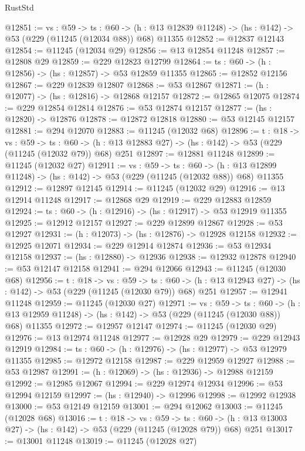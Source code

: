 \begin{lexlean}{RustStd}
\begin{coremodule}
@12851 := {vs : @59} ->
  {ts : @60} ->
  (h : @13 @12839 @11248) -> (hs : @142) -> @53 (@229 (@11245 (@12034 @88)) @68) @11355
@12852 := @12837 @12143
@12854 := @11245 (@12034 @29)
@12856 := @13 @12854 @11248
@12857 := @12808 @29
@12859 := @229 @12823 @12799
@12864 := {ts : @60} -> (h : @12856) -> (hs : @12857) -> @53 @12859 @11355
@12865 := @12852 @12156
@12867 := @229 @12839 @12807
@12868 := @53 @12867
@12871 := (h : @12077) -> (hs : @12816) -> @12868 @12157
@12872 := @12865 @12075
@12874 := @229 @12854 @12814
@12876 := @53 @12874 @12157
@12877 := (hs : @12820) -> @12876
@12878 := @12872 @12818
@12880 := @53 @12145 @12157
@12881 := @294 @12070
@12883 := @11245 (@12032 @68)
@12896 := {t : @18} ->
  {vs : @59} ->
  {ts : @60} -> (h : @13 @12883 @27) -> (hs : @142) -> @53 (@229 (@11245 (@12032 @79)) @68) @251
@12897 := @12881 @11248
@12899 := @11245 (@12032 @27)
@12911 := {vs : @59} ->
  {ts : @60} ->
  (h : @13 @12899 @11248) -> (hs : @142) -> @53 (@229 (@11245 (@12032 @88)) @68) @11355
@12912 := @12897 @12145
@12914 := @11245 (@12032 @29)
@12916 := @13 @12914 @11248
@12917 := @12868 @29
@12919 := @229 @12883 @12859
@12924 := {ts : @60} -> (h : @12916) -> (hs : @12917) -> @53 @12919 @11355
@12925 := @12912 @12157
@12927 := @229 @12899 @12867
@12928 := @53 @12927
@12931 := (h : @12073) -> (hs : @12876) -> @12928 @12158
@12932 := @12925 @12071
@12934 := @229 @12914 @12874
@12936 := @53 @12934 @12158
@12937 := (hs : @12880) -> @12936
@12938 := @12932 @12878
@12940 := @53 @12147 @12158
@12941 := @294 @12066
@12943 := @11245 (@12030 @68)
@12956 := {t : @18} ->
  {vs : @59} ->
  {ts : @60} -> (h : @13 @12943 @27) -> (hs : @142) -> @53 (@229 (@11245 (@12030 @79)) @68) @251
@12957 := @12941 @11248
@12959 := @11245 (@12030 @27)
@12971 := {vs : @59} ->
  {ts : @60} ->
  (h : @13 @12959 @11248) -> (hs : @142) -> @53 (@229 (@11245 (@12030 @88)) @68) @11355
@12972 := @12957 @12147
@12974 := @11245 (@12030 @29)
@12976 := @13 @12974 @11248
@12977 := @12928 @29
@12979 := @229 @12943 @12919
@12984 := {ts : @60} -> (h : @12976) -> (hs : @12977) -> @53 @12979 @11355
@12985 := @12972 @12158
@12987 := @229 @12959 @12927
@12988 := @53 @12987
@12991 := (h : @12069) -> (hs : @12936) -> @12988 @12159
@12992 := @12985 @12067
@12994 := @229 @12974 @12934
@12996 := @53 @12994 @12159
@12997 := (hs : @12940) -> @12996
@12998 := @12992 @12938
@13000 := @53 @12149 @12159
@13001 := @294 @12062
@13003 := @11245 (@12028 @68)
@13016 := {t : @18} ->
  {vs : @59} ->
  {ts : @60} -> (h : @13 @13003 @27) -> (hs : @142) -> @53 (@229 (@11245 (@12028 @79)) @68) @251
@13017 := @13001 @11248
@13019 := @11245 (@12028 @27)

\end{coremodule}
\end{lexlean}
